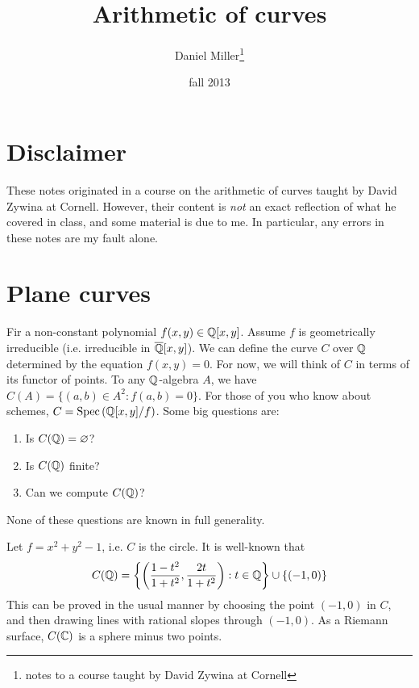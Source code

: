 \documentclass{article}
\title{Arithmetic of curves}
\author{Daniel Miller\thanks{notes to a course taught by David Zywina at Cornell}}
\date{fall 2013}
\begin{document}
\maketitle











\section*{Disclaimer}

These notes originated in a course on the arithmetic of curves taught by David 
Zywina at Cornell. However, their content is \emph{not} an exact reflection of 
what he covered in class, and some material is due to me. In particular, any 
errors in these notes are my fault alone. 










\section{Plane curves}

Fir a non-constant polynomial $f(x,y)\in\mathbb{Q}[x,y]$. Assume $f$ is 
geometrically irreducible (i.e. irreducible in $\overline{\mathbb{Q}}[x,y]$). 
We can define the curve $C$ over $\mathbb{Q}$ determined by the equation 
$f(x,y)=0$. For now, we will think of $C$ in terms of its functor of points. 
To any $\mathbb{Q}$-algebra $A$, we have $C(A)=\{(a,b)\in A^2:f(a,b)=0\}$. 
For those of you who know about schemes, 
$C=\operatorname{Spec}\left(\mathbb{Q}[x,y]/f\right)$. Some big questions are:
\begin{enumerate}
  \item Is $C(\mathbb{Q})=\varnothing$?
  \item Is $C(\mathbb{Q})$ finite?
  \item Can we compute $C(\mathbb{Q})$?
\end{enumerate}
None of these questions are known in full generality. 

\begin{example}
Let $f=x^2+y^2-1$, i.e. $C$ is the circle. It is well-known that 
\[
  C(\mathbb{Q})=\left\{\left(\frac{1-t^2}{1+t^2},\frac{2t}{1+t^2}\right):t\in\mathbb{Q}\right\}\cup \{(-1,0)\}
\]
This can be proved in the usual manner by choosing the point 
$(-1,0)$ in $C$, and then drawing lines with rational slopes through 
$(-1,0)$. As a Riemann surface, $C(\mathbb{C})$ is a sphere minus 
two points. 
\end{example}
\end{document}
